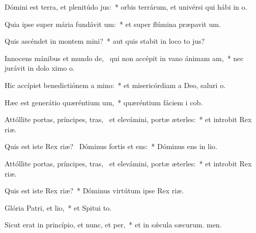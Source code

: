 \item Dómini est terra, et plenitúdo jus:~* orbis terrárum, et univérsi qui hábi in o.
\item Quia ipse super mária fundávit um:~* et super flúmina præpavit um.
\item Quis ascéndet in montem mini?~* aut quis stabit in loco to jus?
\item Innocens mánibus et mundo de,~\pscross{} qui non accépit in vano ánimam am,~* nec jurávit in dolo ximo o.
\item Hic accípiet benedictiónem a mino:~* et misericórdiam a Deo, saluri o.
\item Hæc est generátio quæréntium um,~* quæréntium fáciem i cob.
\item Attóllite portas, príncipes, tras,~\pscross{} et elevámini, portæ æterles:~* et introbit Rex riæ.
\item Quis est iste Rex riæ?~\pscross{} Dóminus fortis et ens:~* Dóminus ens in lio.
\item Attóllite portas, príncipes, tras,~\pscross{} et elevámini, portæ æterles:~* et introbit Rex riæ.
\item Quis est iste Rex riæ?~* Dóminus virtútum ipse  Rex riæ.
\item Glória Patri, et lio,~* et Spitui to.
\item Sicut erat in princípio, et nunc, et per,~* et in sǽcula sæcurum. men.
